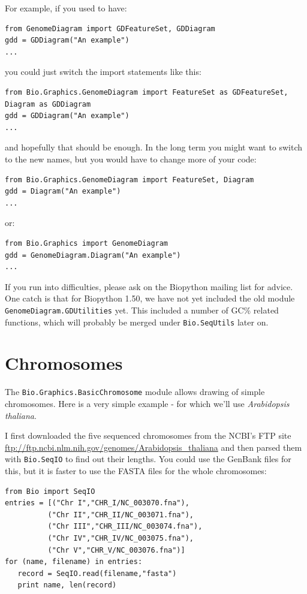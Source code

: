 \documentclass{report}
\begin{document}
For example, if you used to have:
\begin{verbatim}
from GenomeDiagram import GDFeatureSet, GDDiagram
gdd = GDDiagram("An example")
...
\end{verbatim}
you could just switch the import statements like this:
\begin{verbatim}
from Bio.Graphics.GenomeDiagram import FeatureSet as GDFeatureSet, Diagram as GDDiagram
gdd = GDDiagram("An example")
...
\end{verbatim}
and hopefully that should be enough.  In the long term you might want to
switch to the new names, but you would have to change more of your code:
\begin{verbatim}
from Bio.Graphics.GenomeDiagram import FeatureSet, Diagram
gdd = Diagram("An example")
...
\end{verbatim}
or:
\begin{verbatim}
from Bio.Graphics import GenomeDiagram
gdd = GenomeDiagram.Diagram("An example")
...
\end{verbatim}

If you run into difficulties, please ask on the Biopython mailing list for
advice. One catch is that for Biopython 1.50, we have not yet included the
old module \verb|GenomeDiagram.GDUtilities| yet.  This included a number of
GC\% related functions, which will probably be merged under
\verb|Bio.SeqUtils| later on.

\section{Chromosomes}

The \verb|Bio.Graphics.BasicChromosome| module allows drawing of simple chromosomes.
Here is a very simple example - for which we'll use \textit{Arabidopsis thaliana}.

I first downloaded the five sequenced chromosomes from the NCBI's FTP site
\url{ftp://ftp.ncbi.nlm.nih.gov/genomes/Arabidopsis_thaliana} and then parsed
them with \verb|Bio.SeqIO| to find out their lengths.  You could use the
GenBank files for this, but it is faster to use the FASTA files for the
whole chromosomes:

\begin{verbatim}
from Bio import SeqIO
entries = [("Chr I","CHR_I/NC_003070.fna"),
          ("Chr II","CHR_II/NC_003071.fna"),
          ("Chr III","CHR_III/NC_003074.fna"),
          ("Chr IV","CHR_IV/NC_003075.fna"),
          ("Chr V","CHR_V/NC_003076.fna")]
for (name, filename) in entries:
   record = SeqIO.read(filename,"fasta")
   print name, len(record)
\end{verbatim}
\end{document}
